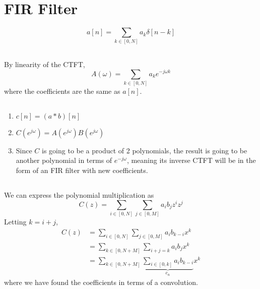 \documentclass{article}
\begin{document}
\section{FIR Filter}

\begin{equation}
    a[n] = \sum_{k \in [0, N]} a_k \delta[n - k]
\end{equation}

\subsection{}

By linearity of the CTFT,
\begin{equation}
    A(\omega) = \sum_{k \in [0, N]} a_k e^{-j \omega k}
\end{equation}
where the coefficients are the same as \(a[n]\).

\subsection{}

\begin{enumerate}
    \item \(c[n] = (a \ast b)[n]\)
    \item \(C(e^{j \omega}) = A(e^{j \omega}) B(e^{j \omega})\)
    \item Since \(C\) is going to be a product of 2 polynomials, the result is going to be another polynomial in terms of \(e^{-j \omega}\), meaning its inverse CTFT will be in the form of an FIR filter with new coefficients.
\end{enumerate}

\subsection{}

We can express the polynomial multiplication as
\begin{equation}
    C(z) = \sum_{i \in [0, N]} \sum_{j \in [0, M]} a_i b_j z^i z^j
\end{equation}
Letting \(k = i + j\),
\begin{align}
    C(z) &= \sum_{i \in [0, N]} \sum_{j \in [0, M]} a_i b_{k - i} x^k \\
    &= \sum_{k \in [0, N + M]} \sum_{i + j = k} a_i b_j x^k \\
    &= \sum_{k \in [0, N + M]} \underbrace{\sum_{i \in [0, k]} a_i b_{k - i}}_{c_n} x^k
\end{align}
where we have found the coefficients in terms of a convolution.
\end{document}
